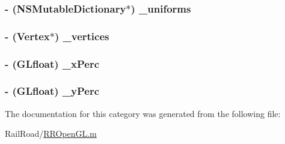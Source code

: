 \hypertarget{category_r_r_open_g_l_07_08_a6a8737289b82b1040fb83611fa628f10}{
\subsubsection[{\-\_\-uniforms}]{\setlength{\rightskip}{0pt plus 5cm}-\/ (N\-S\-Mutable\-Dictionary$\ast$) \-\_\-uniforms\hspace{0.3cm}{\ttfamily [protected]}}}\label{category_r_r_open_g_l_07_08_a6a8737289b82b1040fb83611fa628f10}
\hypertarget{category_r_r_open_g_l_07_08_a95d3fc75bc2d6d641d51e58aaeabe782}{
\subsubsection[{\-\_\-vertices}]{\setlength{\rightskip}{0pt plus 5cm}-\/ ({\bf Vertex}$\ast$) \-\_\-vertices\hspace{0.3cm}{\ttfamily [protected]}}}\label{category_r_r_open_g_l_07_08_a95d3fc75bc2d6d641d51e58aaeabe782}
\hypertarget{category_r_r_open_g_l_07_08_a2954e047e8630ffedf933ebd8c8bcc28}{
\subsubsection[{\-\_\-x\-Perc}]{\setlength{\rightskip}{0pt plus 5cm}-\/ (G\-Lfloat) \-\_\-x\-Perc\hspace{0.3cm}{\ttfamily [protected]}}}\label{category_r_r_open_g_l_07_08_a2954e047e8630ffedf933ebd8c8bcc28}
\hypertarget{category_r_r_open_g_l_07_08_a924c638c3c6712af2a18572577cff216}{
\subsubsection[{\-\_\-y\-Perc}]{\setlength{\rightskip}{0pt plus 5cm}-\/ (G\-Lfloat) \-\_\-y\-Perc\hspace{0.3cm}{\ttfamily [protected]}}}\label{category_r_r_open_g_l_07_08_a924c638c3c6712af2a18572577cff216}


The documentation for this category was generated from the following file\-:\begin{DoxyCompactItemize}
\item 
Rail\-Road/\hyperlink{_r_r_open_g_l_8m}{R\-R\-Open\-G\-L.\-m}\end{DoxyCompactItemize}
